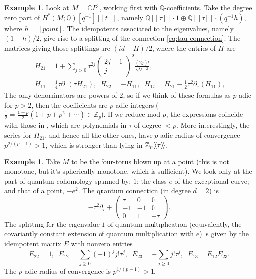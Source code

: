 \documentclass[JEP,XML,SOM,Unicode,NoFloatCountersInSection,published]{cedram}
\newcommand{\llbracket}{[\![}
\newcommand{\rrbracket}{]\!]}
\theoremstyle{plain}
\theoremstyle{definition}
\newtheorem{example}[theorem]{Example}
\newcommand{\bC}{{\mathbb C}}
\newcommand{\bQ}{{\mathbb Q}}
\newcommand{\bZ}{{\mathbb Z}}
\newcommand{\half}{{\textstyle\frac{1}{2}}}
\newcommand{\quarter}{{\textstyle\frac{1}{4}}}
\newcommand{\lla}{\langle\hspace{-0.3ex}\langle}
\newcommand{\rra}{\rangle\hspace{-0.3ex}\rangle}
\begin{document}
\begin{example} \label{th:s2}
Look at $M = \bC P^1$, working first with $\bQ$-coefficients. Take the degree zero part of $H^*(M;\bQ)[q^{\pm 1}]\llbracket t\rrbracket$, namely $\bQ\llbracket \tau\rrbracket \cdot 1 \oplus \bQ\llbracket \tau\rrbracket \cdot (q^{-1}h)$, where $h = [\mathit{point}]$. The idempotents associated to the eigenvalues, namely $(1 \pm h)/2$, give rise to a splitting of the connection \eqref{eq:tau-connection}. The matrices giving those splittings are $(\mathit{id} \pm H)/2$, where the entries of $H$ are
\begin{equation*}
\begin{aligned}
& H_{21} = 1 + \sum_{j>0} \tau^{2j} \left(\begin{smallmatrix} 2j-1 \\ j \end{smallmatrix}\right)^2 \frac{(2j)!}{2^{8j-2}},
\\
& H_{11} = \quarter \tau\partial_\tau(\tau H_{21}), \;\;
H_{22} = -H_{11}, \;\;
H_{12} = H_{21} - \half\tau^2 \partial_\tau(H_{11}), \;\;
\end{aligned}
\end{equation*}
The only denominators are powers of $2$, so if we think of these formulas as $p$-adic for $p>2$, then the coefficients are $p$-adic integers ($\half = \frac{1-p}{2}(1+p+p^2+\cdots) \in \bZ_p$). If we reduce mod $p$, the expressions coincide with those in \cite[Ex.\,1.6]{seidel-wilkins21}, which are polynomials in $\tau$ of degree $<p$. More interestingly, the series for $H_{21}$, and hence all the other ones, have $p$-adic radius of convergence $p^{2/(p-1)} >1$, which is stronger than lying in $\bZ_p\lla \tau \rra$.
\end{example}

\begin{example} \label{th:blowup}
Take $M$ to be the four-torus blown up at a point (this is not monotone, but it's spherically monotone, which is sufficient). We look only at the part of quantum cohomology spanned by: $1$; the class $e$ of the exceptional curve; and that of a point, $-e^2$. The quantum connection (in degree $d = 2$) is
\begin{equation*}
-\tau^2 \partial_{\tau} + \begin{pmatrix} \tau & 0 & 0 \\ -1 & -1 & 0 \\ 0 & 1 & -\tau \end{pmatrix}.
\end{equation*}
The splitting for the eigenvalue $1$ of quantum multiplication (equivalently, the covariantly constant extension of quantum multiplication with $e$) is given by the idempotent matrix $E$ with nonzero entries
\begin{equation*}
E_{22} = 1, \;\;
E_{12} = \sum_{j\geq 0} (-1)^j j! \tau^j, \;\;
E_{23} = -\sum_{j \geq 0} j! \tau^j, \;\;
E_{13} = E_{12}E_{23}.
\end{equation*}
The $p$-adic radius of convergence is $p^{1/(p-1)} > 1$.
\end{example}
\end{document}

